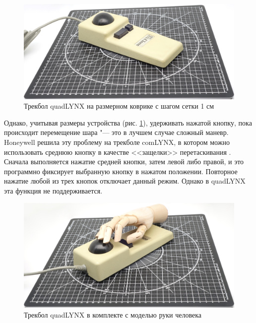 \documentclass[11pt, a4paper]{article}
\begin{document}
\begin{figure}[h]
    \centering
    \includegraphics[scale=0.4]{1986_honeywell_asher_quadlynx_trackball/size_30.jpg}
    \caption{Трекбол quadLYNX на размерном коврике с шагом сетки 1 см}
    \label{fig:quadLYNXSize}
\end{figure}

Однако, учитывая размеры устройства (рис. \ref{fig:quadLYNXSize}), удерживать нажатой кнопку, пока происходит
перемещение шара "--- это в лучшем случае сложный маневр. Honeywell решила эту проблему на трекболе comLYNX, в котором можно использовать среднюю кнопку в качестве <<защелки>> перетаскивания \cite{comlynx}. Сначала выполняется нажатие средней кнопки, затем левой либо правой, и это программно фиксирует выбранную кнопку в нажатом положении. Повторное нажатие любой из трех кнопок отключает данный режим. Однако в quadLYNX эта функция не поддерживается.

\begin{figure}[h]
    \centering
    \includegraphics[scale=0.4]{1986_honeywell_asher_quadlynx_trackball/hand_30.jpg}
    \caption{Трекбол quadLYNX в комплекте с моделью руки человека}
    \label{fig:quadLYNXHand}
\end{figure}
\end{document}
